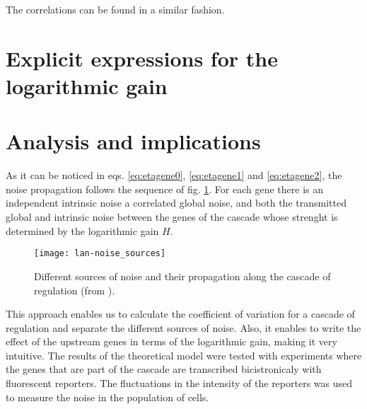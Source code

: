 The correlations can be found in a similar fashion.


\section{Explicit expressions for the logarithmic gain}



\section{Analysis and implications}

As it can be noticed in eqs. \eqref{eq:etagene0}, \eqref{eq:etagene1} and \eqref{eq:etagene2}, the noise propagation follows the sequence of fig. \ref{fig:lan-noise_sources}. For each gene there is an independent intrinsic noise a correlated global noise, and both the transmitted global and intrinsic noise between the genes of the cascade whose strenght is determined by the logarithmic gain $H$.

\begin{figure}[H]
  \centering
  \texttt{[image: lan-noise\_sources]}
  \caption[Propagation of noise through a cascade]{\label{fig:lan-noise_sources} Different sources of noise and their propagation along the cascade of regulation (from \cite{pedraza05}).}
\end{figure}


This approach enables us to calculate the coefficient of variation for a cascade of regulation and separate the different sources of noise. Also, it enables to write the effect of the upstream genes in terms of the logarithmic gain, making it very intuitive. The results of the theoretical model were tested with experiments where the genes that are part of the cascade are transcribed bicistronicaly with fluorescent reporters. The fluctuations in the intensity of the reporters was used to measure the noise in the population of cells.
